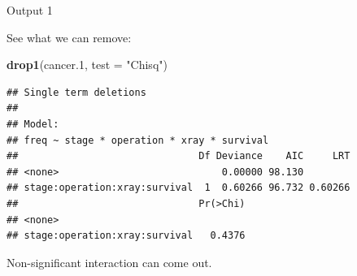 \documentclass[ignorenonframetext,]{beamer}
\newenvironment{Shaded}{\begin{snugshade}}{\end{snugshade}}
\newcommand{\DataTypeTok}[1]{\textcolor[rgb]{0.13,0.29,0.53}{#1}}
\newcommand{\FloatTok}[1]{\textcolor[rgb]{0.00,0.00,0.81}{#1}}
\newcommand{\KeywordTok}[1]{\textcolor[rgb]{0.13,0.29,0.53}{\textbf{#1}}}
\newcommand{\NormalTok}[1]{#1}
\newcommand{\StringTok}[1]{\textcolor[rgb]{0.31,0.60,0.02}{#1}}
\begin{document}
\begin{frame}[fragile]{Output 1}
\protect\hypertarget{output-1-1}{}

See what we can remove:

\scriptsize

\begin{Shaded}
\begin{Highlighting}[]
\KeywordTok{drop1}\NormalTok{(cancer}\FloatTok{.1}\NormalTok{, }\DataTypeTok{test =} \StringTok{"Chisq"}\NormalTok{)}
\end{Highlighting}
\end{Shaded}

\begin{verbatim}
## Single term deletions
## 
## Model:
## freq ~ stage * operation * xray * survival
##                               Df Deviance    AIC     LRT
## <none>                            0.00000 98.130        
## stage:operation:xray:survival  1  0.60266 96.732 0.60266
##                               Pr(>Chi)
## <none>                                
## stage:operation:xray:survival   0.4376
\end{verbatim}

\normalsize

Non-significant interaction can come out.

\end{frame}
\end{document}
